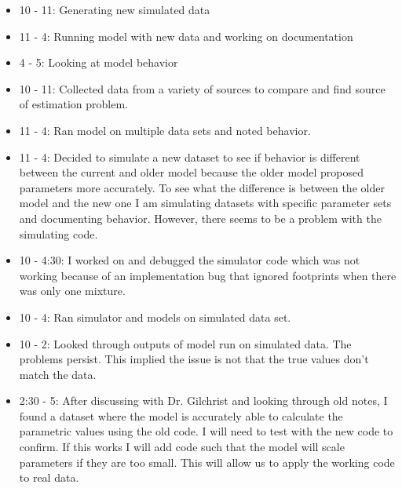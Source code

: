 \documentclass[12pt,hyperref]{labbook}
\begin{document}
\begin{itemize}
    \item 10 - 11: Generating new simulated data
    \item 11 - 4: Running model with new data and working on documentation
    \item 4 - 5: Looking at model behavior
\end{itemize}
\begin{itemize}
    \item 10 - 11: Collected data from a variety of sources to compare and find source of estimation problem.
    \item 11 - 4: Ran model on multiple data sets and noted behavior.
\end{itemize}
\begin{itemize}
    \item 11 - 4: Decided to simulate a new dataset to see if behavior is different between the current and older model because the older model 
    proposed parameters more accurately. To see what the difference is between the older model and the new one I am simulating datasets with    
    specific parameter sets and documenting behavior. However, there seems to be a problem with the simulating code.
\end{itemize}
\begin{itemize}
    \item 10 - 4:30: I worked on and debugged the simulator code which was not working because of an implementation bug that ignored footprints 
    when there was only one mixture.
\end{itemize}
\begin{itemize}
    \item  10 - 4: Ran simulator and models on simulated data set.
\end{itemize}
\begin{itemize}
    \item 10 - 2: Looked through outputs of model run on simulated data. The problems persist. This implied the issue is not that the true
        values don't match the data.
    \item 2:30 - 5: After discussing with Dr. Gilchrist and looking through old notes, I found a dataset where the model is accurately able to
        calculate the parametric values using the old code. I will need to test with the new code to confirm. If this works I will add code 
        such that the model will scale parameters if they are too small. This will allow us to apply the working code to real data.
\end{itemize}
\end{document}
